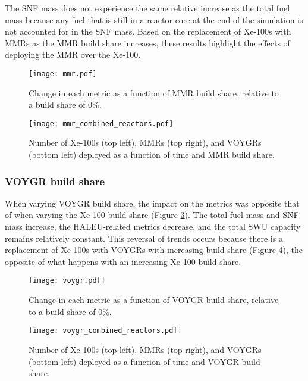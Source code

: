 The \gls{SNF} mass does not experience the same 
relative increase as the total fuel mass because any fuel that is still in a 
reactor core at the end of the simulation is not accounted for in the 
\gls{SNF} mass. 
Based on the replacement of Xe-100s with \glspl{MMR} as the \gls{MMR} 
build share increases, these results highlight the effects of deploying the
\gls{MMR} over the Xe-100. 

\begin{figure}
    \centering
    \texttt{[image: mmr.pdf]}
    \caption{Change in each metric as a function of MMR build share, 
    relative to a build share of 0\%.}
    \label{fig:mmr_scenario7}
\end{figure}


\begin{figure}
    \centering
    \texttt{[image: mmr\_combined\_reactors.pdf]}
    \caption{Number of Xe-100s (top left), MMRs (top right), and 
    VOYGRs (bottom left) deployed as a function of time and 
    MMR build share.}
    \label{fig:mmr_reactors_s7}
\end{figure}


\subsubsection{VOYGR build share}
When varying VOYGR build share, the impact on the metrics was 
opposite that of when varying the Xe-100 build share (Figure 
\ref{fig:voygr_scenario7}). The total fuel mass and \gls{SNF} mass 
increase, the \gls{HALEU}-related metrics decrease, and the total 
\gls{SWU} capacity remains relatively constant. This reversal 
of trends occurs because there is a replacement of Xe-100s with VOYGRs
with increasing build share (Figure \ref{fig:voygr_reactors_s7}), 
the opposite of what happens with an increasing Xe-100 build share. 

\begin{figure}
    \centering
    \texttt{[image: voygr.pdf]}
    \caption{Change in each metric as a function of VOYGR build share, 
    relative to a build share of 0\%.}
    \label{fig:voygr_scenario7}
\end{figure}

\begin{figure}
    \centering
    \texttt{[image: voygr\_combined\_reactors.pdf]}
    \caption{Number of Xe-100s (top left), MMRs (top right), and 
    VOYGRs (bottom left) deployed as a function of time and 
    VOYGR build share.}
    \label{fig:voygr_reactors_s7}
\end{figure}

